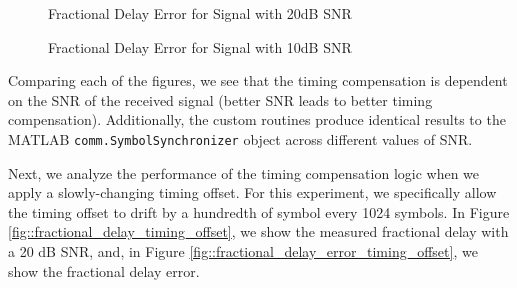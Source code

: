 \documentclass{article}
\begin{document}
\begin{figure}[H]
	\centerline{}
	\caption{Fractional Delay Error for Signal with 20dB SNR}
	\label{fig::delay_error_20dB_snr}
\end{figure}

\begin{figure}[H]
	\centerline{}
	\caption{Fractional Delay Error for Signal with 10dB SNR}
	\label{fig::delay_error_10dB_snr}
\end{figure}

\noindent Comparing each of the figures, we see that the timing compensation is dependent on the SNR of the received signal (better SNR leads to better timing compensation). Additionally, the custom routines produce identical results to the MATLAB \texttt{comm.SymbolSynchronizer} object across different values of SNR.

Next, we analyze the performance of the timing compensation logic when we apply a slowly-changing timing offset. For this experiment, we specifically allow the timing offset to drift by a hundredth of symbol every 1024 symbols. In Figure \ref{fig::fractional_delay_timing_offset}, we show the measured fractional delay with a 20 dB SNR, and, in Figure \ref{fig::fractional_delay_error_timing_offset}, we show the fractional delay error.
\end{document}
